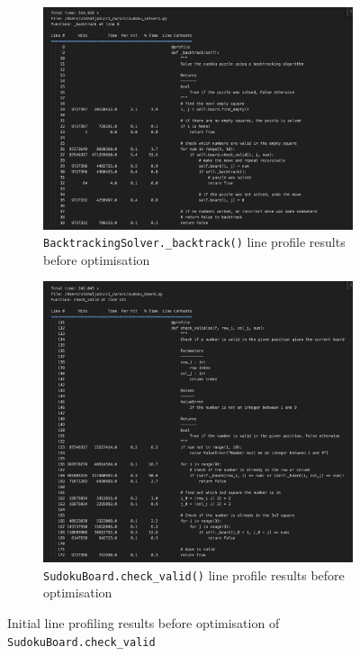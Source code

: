 \documentclass[11pt]{article}
\begin{document}
\begin{figure}[H]
    \centering
    \begin{subfigure}[b]{0.8\textwidth}
        \includegraphics[width=\textwidth]{figs/bt_line_profile_before.png}
        \caption{\texttt{BacktrackingSolver.\_backtrack()} line profile results before optimisation}
        \label{fig:backtrack_before}
    \end{subfigure}
    \begin{subfigure}[b]{0.8\textwidth}
        \includegraphics[width=\textwidth]{figs/check_valid_before.png}
        \caption{\texttt{SudokuBoard.check\_valid()} line profile results before optimisation}
        \label{fig:check_valid_before}
    \end{subfigure}
    \caption{Initial line profiling results before optimisation of \texttt{SudokuBoard.check\_valid}}
    \label{fig:line_profiling_initial}
\end{figure}
\end{document}
